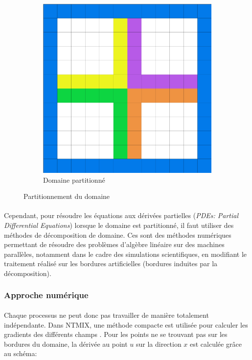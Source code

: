 \begin{figure}[!ht]
\begin{subfigure}[b]{0.5\textwidth}
    \includegraphics[scale=0.15]{figures/partitionnedomain.png}
  \caption{\label{fig:partdom}Domaine partitionné}
  \end{subfigure}
  \caption{\label{fig:dom}Partitionnement du domaine}
\end{figure}


\paragraph{}Cependant, pour résoudre les équations aux dérivées partielles (\textit{PDEs: Partial Differential Equations}) lorsque le domaine est partitionné, il faut utiliser des méthodes de décomposition de domaine. Ces sont des méthodes numériques permettant de résoudre des problèmes d'algèbre linéaire sur des machines parallèles, notamment dans le cadre des simulations scientifiques, en modifiant le traitement réalisé sur les bordures artificielles (bordures induites par la décomposition).\cite{dolean+jolivet+nataf}


\subsubsection{Approche numérique}\label{sec:numerical_dom_decompo}

\paragraph{}Chaque processus ne peut donc pas travailler de manière totalement indépendante. Dans NTMIX, une méthode compacte est utilisée pour calculer les gradients des différents champs \cite{Hirsch:1988:NCI:63653}. Pour les points ne se trouvant pas sur les bordures du domaine, la dérivée au point $u$ sur la direction $x$ est calculée grâce au schéma:

